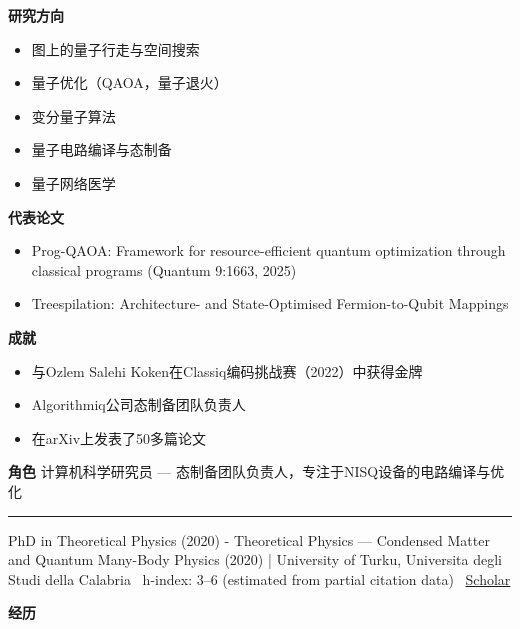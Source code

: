 \par{\footnotesize\color{mainred}\textbf{研究方向}}
\begin{itemize}[leftmargin=1.2em,itemsep=0pt,topsep=0pt]
\item {\footnotesize 图上的量子行走与空间搜索}
\item {\footnotesize 量子优化（QAOA，量子退火）}
\item {\footnotesize 变分量子算法}
\item {\footnotesize 量子电路编译与态制备}
\item {\footnotesize 量子网络医学}
\end{itemize}
\par{\footnotesize\color{mainred}\textbf{代表论文}}
\begin{itemize}[leftmargin=1.2em,itemsep=0pt,topsep=0pt]
\item {\footnotesize Prog-QAOA: Framework for resource-efficient quantum optimization through classical programs (Quantum 9:1663, 2025)}
\item {\footnotesize Treespilation: Architecture- and State-Optimised Fermion-to-Qubit Mappings}
\end{itemize}
\par{\footnotesize\color{mainred}\textbf{成就}}
\begin{itemize}[leftmargin=1.2em,itemsep=0pt,topsep=0pt]
\item {\footnotesize 与Ozlem Salehi Koken在Classiq编码挑战赛（2022）中获得金牌}
\item {\footnotesize Algorithmiq公司态制备团队负责人}
\item {\footnotesize 在arXiv上发表了50多篇论文}
\end{itemize}
\par{\footnotesize\color{mainred}\textbf{角色}} {\footnotesize 计算机科学研究员 — 态制备团队负责人，专注于NISQ设备的电路编译与优化}
\vspace{2pt}\hrule\vspace{2pt}
\vspace{4pt}
\par{\footnotesize\color{graytext}PhD in Theoretical Physics (2020) - Theoretical Physics — Condensed Matter and Quantum Many-Body Physics (2020) | University of Turku, Universita degli Studi della Calabria \textbar\  h-index: 3–6 (estimated from partial citation data) \textbar\  \href{https://scholar.google.co.th/citations?user=I9J5N84AAAAJ}{Scholar}}
\par{\footnotesize\color{mainred}\textbf{经历}}
